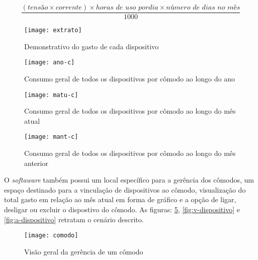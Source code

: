 \begin{equation} \label{eq-potencia}
	 \frac{ (tensão \times corrente) \times horas \, \, de \, \, uso \, \, por dia \times número \, \, de \, \, dias \, \, no \, \, mês}{1000}
\end{equation} 

\begin{figure}[h!]
	\texttt{[image: extrato]}
	\centering
	\caption[Demonstrativo do gasto de cada dispositivo]{Demonstrativo do gasto de cada dispositivo}
	\label{fig:extrato} 
\end{figure}
\FloatBarrier

\begin{figure}[h!]
	\texttt{[image: ano-c]}
	\centering
	\caption[Consumo geral de todos os dispositivos por cômodo ao longo do ano]{Consumo geral de todos os dispositivos por cômodo ao longo do ano}
	\label{fig:ano-c} 
\end{figure}
\FloatBarrier

\begin{figure}[h!]
	\texttt{[image: matu-c]}
	\centering
	\caption[Consumo geral de todos os dispositivos por cômodo ao longo do mês atual]{Consumo geral de todos os dispositivos por cômodo ao longo do mês atual}
	\label{fig:matu-c} 
\end{figure}
\FloatBarrier

\begin{figure}[h!]
	\texttt{[image: mant-c]}
	\centering
	\caption[Consumo geral de todos os dispositivos por cômodo ao longo do mês anterior]{Consumo geral de todos os dispositivos por cômodo ao longo do mês anterior}
	\label{fig:mant-c} 
\end{figure}
\FloatBarrier

O \textit{softaware} também possui um local específico para a gerência dos cômodos, um espaço destinado para a vinculação de dispositivos ao cômodo,
visualização do total gasto em relação ao mês atual em forma de gráfico e a opção de ligar, desligar ou excluir o dispostivo do cômodo. As figuras:
\ref{fig:comodo-ft}, \ref{fig:v-dispositivo} e \ref{fig:a-dispositivo} retratam o cenário descrito.

\begin{figure}[h!]
	\texttt{[image: comodo]}
	\centering
	\caption[Visão geral da gerência de um cômodo]{Visão geral da gerência de um cômodo}
	\label{fig:comodo-ft} 
\end{figure}
\FloatBarrier


